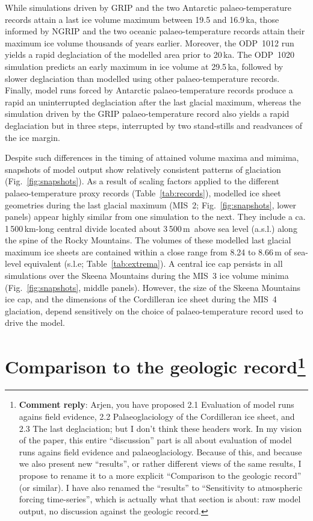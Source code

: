 \documentclass[tc, manuscript]{copernicus}
\newcommand{\renote}[1]{\footnote{\textbf{Comment reply}: #1}}
\begin{document}
While simulations driven by GRIP and the two Antarctic palaeo-temperature
records attain a last ice volume maximum between 19.5 and 16.9\,ka, those
informed by NGRIP and the two oceanic palaeo-temperature records attain their
maximum ice volume thousands of years earlier. Moreover, the ODP~1012 run
yields a rapid deglaciation of the modelled area prior to 20\,ka. The ODP~1020
simulation predicts an early maximum in ice volume at 29.5\,ka, followed by
slower deglaciation than modelled using other palaeo-temperature records.
Finally, model runs forced by Antarctic palaeo-temperature records produce a
rapid an uninterrupted deglaciation after the last glacial maximum, whereas the
simulation driven by the GRIP palaeo-temperature record also yields a rapid
deglaciation but in three steps, interrupted by two stand-stills and readvances
of the ice margin.

Despite such differences in the timing of attained volume maxima and mimima,
snapshots of model output show relatively consistent patterns of glaciation
(Fig.~\ref{fig:snapshots}). As a result of scaling factors applied to the
different palaeo-temperature proxy records (Table~\ref{tab:records}), modelled
ice sheet geometries during the last glacial maximum (MIS~2;
Fig.~\ref{fig:snapshots}, lower panels) appear highly similar from one
simulation to the next. They include a ca. 1\,500\,km-long central divide
located about 3\,500\,m\ above sea level (a.s.l.) along the spine of the Rocky
Mountains. The volumes of these modelled last glacial maximum ice sheets are
contained within a close range from 8.24 to 8.66\,m of sea-level equivalent
(s.l.e; Table~\ref{tab:extrema}).
A central ice cap persists in all simulations over the Skeena
Mountains during the MIS~3 ice volume minima (Fig.~\ref{fig:snapshots}, middle
panels). However, the size of the Skeena Mountains ice cap, and the dimensions
of the Cordilleran ice sheet during the MIS~4 glaciation, depend sensitively on
the choice of palaeo-temperature record used to drive the model.


\section[Comparison to the geologic record]
        {Comparison to the geologic record\renote{
    Arjen, you have proposed 2.1 Evaluation of model runs agains field
    evidence, 2.2 Palaeoglaciology of the Cordilleran ice sheet, and 2.3 The
    last deglaciation; but I don't think these headers work. In my vision of
    the paper, this entire ``discussion'' part is all about evaluation of model
    runs agains field evidence and palaeoglaciology. Because of this, and
    because we also present new ``results'', or rather different views of the
    same results, I propose to rename it to a more explicit ``Comparison to the
    geologic record'' (or similar). I have also renamed the ``results'' to
    ``Sensitivity to atmospheric forcing time-series'', which is actually what
    that section is about: raw model output, no discussion against the geologic
    record.}}
\label{sec:discussion}
\end{document}

